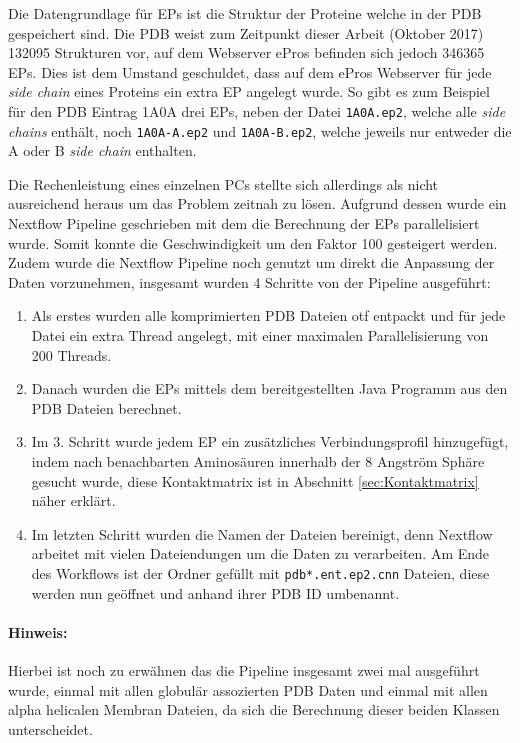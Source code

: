 Die Datengrundlage für \ac{EPs} ist die Struktur der Proteine welche in der \ac{PDB} gespeichert sind. Die \ac{PDB} weist zum Zeitpunkt dieser Arbeit (Oktober 2017) 132095 Strukturen vor, auf dem Webserver ePros befinden sich jedoch 346365 \ac{EPs}. Dies ist dem Umstand geschuldet, dass auf dem ePros Webserver für jede \emph{side chain} eines Proteins ein extra \ac{EP} angelegt wurde. So gibt es zum Beispiel für den \ac{PDB} Eintrag 1A0A drei \ac{EPs}, neben der Datei \texttt{1A0A.ep2}, welche alle \emph{side chains} enthält, noch \texttt{1A0A-A.ep2} und \texttt{1A0A-B.ep2}, welche jeweils nur entweder die A oder B \emph{side chain} enthalten.

Die Rechenleistung eines einzelnen PCs stellte sich allerdings als nicht ausreichend heraus um das Problem zeitnah zu lösen. Aufgrund dessen wurde ein Nextflow Pipeline geschrieben mit dem die Berechnung der \ac{EPs}  parallelisiert wurde. Somit konnte die Geschwindigkeit um den Faktor 100 gesteigert werden. Zudem wurde die Nextflow Pipeline noch genutzt um direkt die Anpassung der Daten vorzunehmen, insgesamt wurden 4 Schritte von der Pipeline ausgeführt:

\begin{enumerate}
    \item
        Als erstes wurden alle komprimierten \ac{PDB} Dateien \ac{otf} entpackt und für jede Datei ein extra Thread angelegt, mit einer maximalen Parallelisierung von 200 Threads.
    \item 
        Danach wurden die \ac{EPs}  mittels dem bereitgestellten Java Programm aus den \ac{PDB} Dateien berechnet.
    \item
        Im 3. Schritt wurde jedem \ac{EP} ein zusätzliches Verbindungsprofil hinzugefügt, indem nach benachbarten Aminosäuren innerhalb der 8 Angström Sphäre gesucht wurde, diese Kontaktmatrix ist in Abschnitt \ref{sec:Kontaktmatrix} näher erklärt.
    \item
        Im letzten Schritt wurden die Namen der Dateien bereinigt, denn Nextflow arbeitet mit vielen Dateiendungen um die Daten zu verarbeiten. Am Ende des Workflows ist der Ordner gefüllt mit \texttt{pdb*.ent.ep2.cnn} Dateien, diese werden nun geöffnet und anhand ihrer \ac{PDB} ID umbenannt.
\end{enumerate}

\paragraph{Hinweis:} Hierbei ist noch zu erwähnen das die Pipeline insgesamt zwei mal ausgeführt wurde, einmal mit allen globulär assozierten \ac{PDB} Daten und einmal mit allen alpha helicalen Membran Dateien, da sich die Berechnung dieser beiden Klassen unterscheidet.

